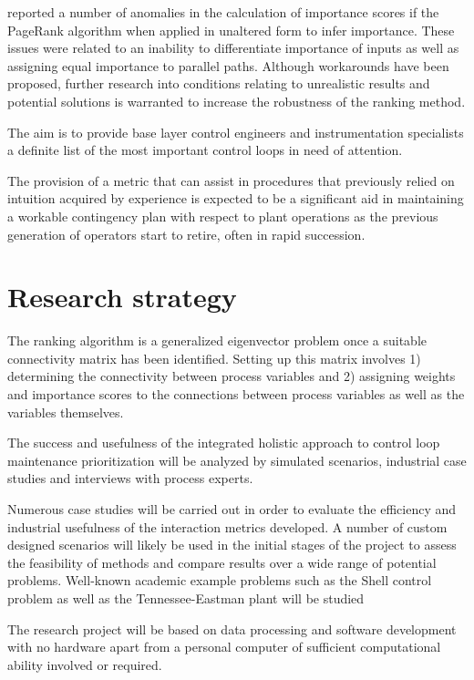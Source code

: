 \documentclass{article}
\begin{document}
\citet{Wilken2012} reported a number of anomalies in the calculation of importance scores if the PageRank algorithm when applied in unaltered form to infer importance. These issues were related to an inability to differentiate importance of inputs as well as assigning equal importance to parallel paths. Although workarounds have been proposed, further research into conditions relating to unrealistic results and potential solutions is warranted to increase the robustness of the ranking method.


The aim is to provide base layer control engineers and instrumentation specialists a definite list of the most important control loops in need of attention.

The provision of a metric that can assist in procedures that previously relied on intuition acquired by experience is expected to be a significant aid in maintaining a workable contingency plan with respect to plant operations as the previous generation of operators start to retire, often in rapid succession.

\newpage
\section{Research strategy}

The ranking algorithm is a generalized eigenvector problem once a suitable connectivity matrix has been identified. Setting up this matrix involves 1) determining the connectivity between process variables and 2) assigning weights and importance scores to the connections between process variables as well as the variables themselves.

The success and usefulness of the integrated holistic approach to control loop maintenance prioritization will be analyzed by simulated scenarios, industrial case studies and interviews with process experts.

Numerous case studies will be carried out in order to evaluate the efficiency and industrial usefulness of the interaction metrics developed.
A number of custom designed scenarios will likely be used in the initial stages of the project to assess the feasibility of methods and compare results over a wide range of potential problems.
Well-known academic example problems such as the Shell control problem as well as the Tennessee-Eastman plant will be studied



The research project will be based on data processing and software development with no hardware apart from a personal computer of sufficient computational ability involved or required.
\end{document}
